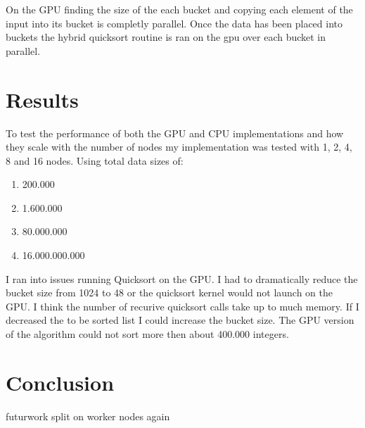 \documentclass[lang=en, hanging-titles=true]{skrapport}
\begin{document}
On the GPU finding the size of the each bucket and copying each element of the input into its bucket is completly parallel. Once the data has been placed into buckets the hybrid quicksort routine is ran on the gpu over each bucket in parallel.

\section{Results}
To test the performance of both the GPU and CPU implementations and how they scale with the number of nodes my implementation was tested with 1, 2, 4, 8 and 16 nodes. Using total data sizes of:

\begin{enumerate}
	\item 200.000
	\item 1.600.000
	\item 80.000.000
	\item 16.000.000.000
\end{enumerate}

I ran into issues running Quicksort on the GPU. I had to dramatically reduce the bucket size from 1024 to 48 or the quicksort kernel would not launch on the GPU. I think the number of recurive quicksort calls take up to much memory. If I decreased the to be sorted list I could increase the bucket size. The GPU version of the algorithm could not sort more then about 400.000 integers.



\section{Conclusion}


futurwork
split on worker nodes again

%

% 
\end{document}
